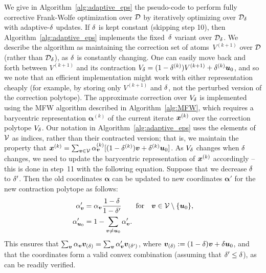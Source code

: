 We give in Algorithm~\ref{alg:adaptive_eps} the pseudo-code to perform fully corrective Frank-Wolfe optimization over $\mathcal{D}$ by iteratively optimizing over $\mathcal{D}_{\delta}$ with adaptive-$\delta$ updates.
If $\delta$ is kept constant (skipping step 10), then Algorithm~\ref{alg:adaptive_eps} implements the
fixed~$\delta$ variant over $\mathcal{D}_{\delta}$. We describe the algorithm as maintaining the correction set of atoms~$V^{(k+1)}$ over $\mathcal{D}$ (rather than $\mathcal{D}_{\delta}$), as $\delta$ is constantly changing. One can easily move back and forth between $V^{(k+1)}$ and its contraction $V_\delta = (1-\delta^{(k)})V^{(k+1)} + \delta^{(k)} \bm{u}_0$, and so we note that an efficient implementation might work with either representation cheaply (for example, by storing only $V^{(k+1)}$ and $\delta$, not the perturbed version of the correction polytope). The approximate correction over $V_\delta$ is implemented using the MFW algorithm described in Algorithm~\ref{alg:MFW}, which requires a barycentric representation $\bm{\alpha}^{(k)}$ of the current iterate $\bm{x}^{(k)}$ over the correction polytope $V_\delta$. Our notation in Algorithm~\ref{alg:adaptive_eps} uses the elements of $\mathcal{V}$ as indices, rather than their contracted version; that is, we maintain the property that $\bm{x}^{(k)} = \sum_{\bm{v} \in \mathcal{V}} \alpha_{\bm{v}}^{(k)} [(1-\delta^{(k)}) \bm{v} + \delta^{(k)} \bm{u}_0]$. As $V_\delta$ changes when $\delta$ changes, we need to update the barycentric representation of $\bm{x}^{(k)}$ accordingly -- this is done in step~11 with the following equation. Suppose that we decrease $\delta$ to $\delta'$. Then the old coordinates $\bm{\alpha}$ can be updated to new coordinates $\bm{\alpha}'$ for the new contraction polytope as follows:
\begin{align}
\begin{split} \label{eq:alpha_update}
\alpha'_{\bm{v}} &= \alpha_{\bm{v}} \frac{1-\delta}{1-\delta'} \qquad \text{for} \quad \bm{v} \in \mathcal{V} \setminus \{\bm{u}_0 \}, \\
\alpha'_{\bm{u}_0} &= 1-\sum_{\bm{v} \neq \bm{u}_0} \alpha'_{\bm{v}}.
\end{split}
\end{align} 
This ensures that $\sum_{\bm{v}} \alpha_{\bm{v}} \bm{v}_{(\delta)} = \sum_{\bm{v}} \alpha'_{\bm{v}} \bm{v}_{(\delta')}$, where $\bm{v}_{(\delta)} := (1-\delta) \bm{v} + \delta \bm{u}_0$, and that the coordinates form a valid convex combination (assuming that $\delta' \leq \delta$), as can be readily verified.

